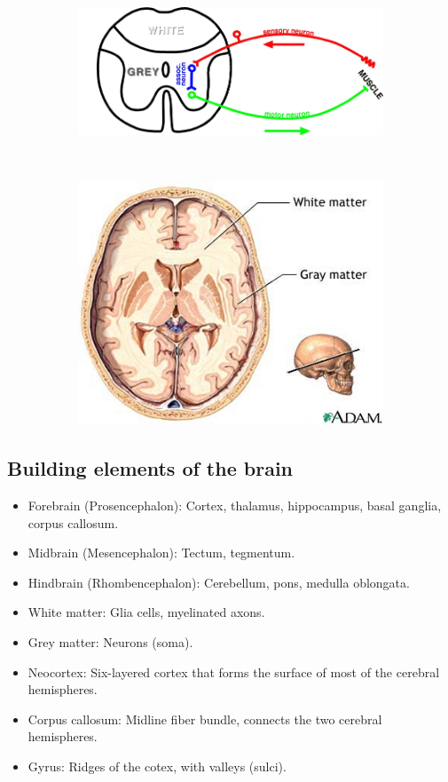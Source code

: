 \documentclass[a4paper, 12pt]{article}
\begin{document}
\begin{figure}[H]
	\centering
	\begin{subfigure}[b]{0.5\textwidth}
		\centering
		\includegraphics[width=\textwidth]{motor-sensory-neuron.png}
	\end{subfigure}%
	~
	\begin{subfigure}[b]{0.5\textwidth}
		\centering
		\includegraphics[width=\textwidth]{brain-cut.png}
	\end{subfigure}
\end{figure}

\subsection{Building elements of the brain}
\begin{itemize}[noitemsep,nolistsep]
	\item Forebrain (Prosencephalon): Cortex, thalamus, hippocampus, basal ganglia, corpus callosum.
	\item Midbrain (Mesencephalon): Tectum, tegmentum.
	\item Hindbrain (Rhombencephalon): Cerebellum, pons, medulla oblongata.
	\item White matter: Glia cells, myelinated axons.
	\item Grey matter: Neurons (soma).
	\item Neocortex: Six-layered cortex that forms the surface of most of the cerebral hemispheres.
	\item Corpus callosum: Midline fiber bundle, connects the two cerebral hemispheres.
	\item Gyrus: Ridges of the cotex, with valleys (sulci).
\end{itemize}
\end{document}
